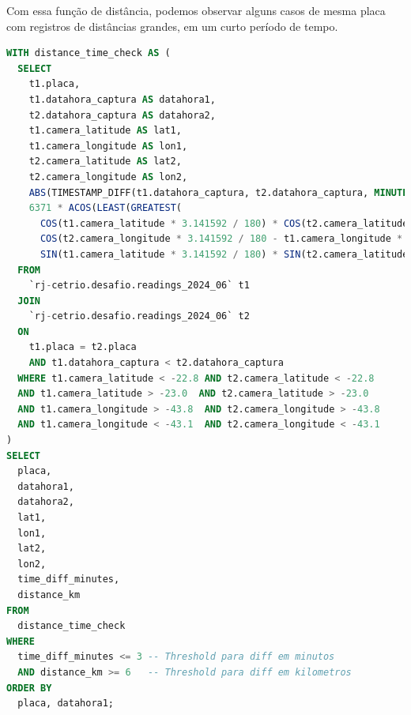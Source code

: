 \documentclass{article}
\begin{document}
Com essa função de distância, podemos observar alguns casos de mesma placa com registros de distâncias grandes, em um curto período de tempo.

\begin{lstlisting}[language=SQL,caption={Exemplo de query SQL para detectar inconsistências e retornar casos de mesma placa com registros distantes um do outro, segundo a fórmula de haversine, mas com diferença de tempo entre eles de curta. Considerando inconsistente percorrer mais de 6km em menos de 3 minutos (120km/h de média). Como discutido no artigo, podemos substituir última condicional WHERE para "time\_diff\_minutes $ \leq $ distance\_km/5" para melhor resultados.},label={lst:sqlquery3}]
WITH distance_time_check AS (
  SELECT
    t1.placa,
    t1.datahora_captura AS datahora1,
    t2.datahora_captura AS datahora2,
    t1.camera_latitude AS lat1,
    t1.camera_longitude AS lon1,
    t2.camera_latitude AS lat2,
    t2.camera_longitude AS lon2,
    ABS(TIMESTAMP_DIFF(t1.datahora_captura, t2.datahora_captura, MINUTE)) AS time_diff_minutes,
    6371 * ACOS(LEAST(GREATEST(
      COS(t1.camera_latitude * 3.141592 / 180) * COS(t2.camera_latitude * 3.141592 / 180) * 
      COS(t2.camera_longitude * 3.141592 / 180 - t1.camera_longitude * 3.141592 / 180) + 
      SIN(t1.camera_latitude * 3.141592 / 180) * SIN(t2.camera_latitude * 3.141592 / 180),-1),1)) AS distance_km
  FROM
    `rj-cetrio.desafio.readings_2024_06` t1
  JOIN
    `rj-cetrio.desafio.readings_2024_06` t2
  ON
    t1.placa = t2.placa
    AND t1.datahora_captura < t2.datahora_captura
  WHERE t1.camera_latitude < -22.8 AND t2.camera_latitude < -22.8 
  AND t1.camera_latitude > -23.0  AND t2.camera_latitude > -23.0 
  AND t1.camera_longitude > -43.8  AND t2.camera_longitude > -43.8
  AND t1.camera_longitude < -43.1  AND t2.camera_longitude < -43.1
)
SELECT
  placa,
  datahora1,
  datahora2,
  lat1,
  lon1,
  lat2,
  lon2,
  time_diff_minutes,
  distance_km
FROM
  distance_time_check
WHERE
  time_diff_minutes <= 3 -- Threshold para diff em minutos
  AND distance_km >= 6   -- Threshold para diff em kilometros
ORDER BY
  placa, datahora1;
\end{lstlisting}
\end{document}
